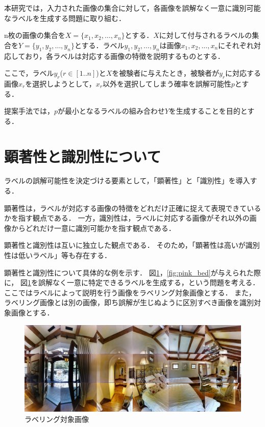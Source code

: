\documentclass[a4paper,11pt]{jreport}
\begin{document}
本研究では，入力された画像の集合に対して，各画像を誤解なく一意に識別可能なラベルを生成する問題に取り組む．

n枚の画像の集合を\(X = \{x_1, x_2, \ldots, x_n\}\)とする．\(X\)に対して付与されるラベルの集合を\(Y = \{y_1, y_2, \ldots, y_n\}\)とする．ラベル\(y_1, y_2, \ldots, y_n\)は画像\(x_1, x_2, \ldots, x_n\)にそれぞれ対応しており，各ラベルは対応する画像の特徴を説明するものとする．

ここで，ラベル\(y_r\)($r \in [1..n]$)と\(X\)を被験者に与えたとき，被験者が\(y_r\)に対応する画像\(x_r\)を選択しようとして，\(x_r\)以外を選択してしまう確率を誤解可能性\(p\)とする．

提案手法では，\(p\)が最小となるラベルの組み合わせ\(Y\)を生成することを目的とする．

\section{顕著性と識別性について}

ラベルの誤解可能性を決定づける要素として，「顕著性」と「識別性」を導入する．

顕著性は，ラベルが対応する画像の特徴をどれだけ正確に捉えて表現できているかを指す観点である．
一方，識別性は，ラベルに対応する画像がそれ以外の画像からどれだけ一意に識別可能かを指す観点である．

顕著性と識別性は互いに独立した観点である．
そのため，「顕著性は高いが識別性は低いラベル」等も存在する．

顕著性と識別性について具体的な例を示す．
図\ref{fig:white_bed}，\ref*{fig:pink_bed}が与えられた際に，
図\ref{fig:white_bed}を誤解なく一意に特定できるラベルを生成する，という問題を考える．
ここではラベルによって説明を行う画像をラベリング対象画像とする．
また，ラベリング画像とは別の画像，即ち誤解が生じぬように区別すべき画像を識別対象画像とする．

\begin{figure}[H]
	\centering
	\includegraphics[width=0.8\linewidth]{figures/3-2_white_bed.jpg}
	\caption{ラベリング対象画像}
	\label{fig:white_bed}
\end{figure}
\end{document}
